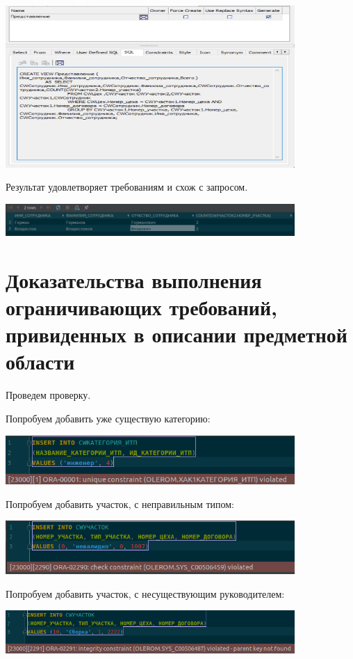 \includegraphics[width=11cm]{./screenshots/view/sql.png}

Результат удовлетворяет требованиям и схож с запросом.

\includegraphics[width=11cm]{./screenshots/view/result.png}

\section{Доказательства выполнения ограничивающих требований, привиденных в описании предметной области}

Проведем проверку.

Попробуем добавить уже существую категорию:

\includegraphics[width=11cm]{./screenshots/constraints/cat_itp.png}

Попробуем добавить участок, с неправильным типом:

\includegraphics[width=11cm]{./screenshots/constraints/field_type.png}

Попробуем добавить участок, с несуществующим руководителем:

\includegraphics[width=11cm]{./screenshots/constraints/field.png}

